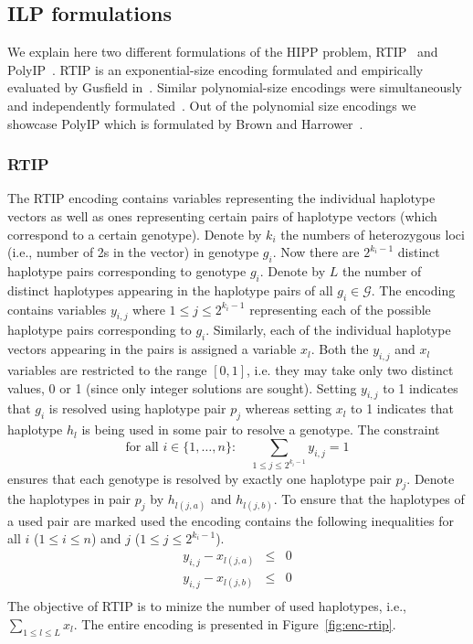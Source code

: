\documentclass[12pt,a4paper]{article}
\begin{document}
\subsection{ILP formulations}
We explain here two different formulations of the HIPP problem, RTIP~\cite{DBLP:conf/cpm/Gusfield03} and PolyIP~\cite{DBLP:journals/tcbb/BrownH06}.
RTIP is an exponential-size encoding formulated and empirically evaluated by Gusfield in~\cite{DBLP:conf/cpm/Gusfield03}.
Similar polynomial-size encodings were simultaneously and independently formulated~\cite{DBLP:journals/tcbb/BrownH06, DBLP:conf/recomb/HalldorssonBELYI02, DBLP:journals/informs/LanciaPR04}.
Out of the polynomial size encodings we showcase PolyIP which is formulated by Brown and Harrower~\cite{DBLP:journals/tcbb/BrownH06}.

\subsubsection{RTIP}

The RTIP encoding contains variables representing the individual haplotype vectors as well as ones representing certain pairs of haplotype vectors (which correspond to a certain genotype).
Denote by $k_i$ the numbers of heterozygous loci (i.e., number of 2s in the vector) in genotype $g_i$.
Now there are $2^{k_i-1}$ distinct haplotype pairs corresponding to genotype $g_i$.
Denote by $L$ the number of distinct haplotypes appearing in the haplotype pairs of all $g_i\in\mathcal{G}$.
The encoding contains variables $y_{i,j}$ where $1\leq j \leq 2^{k_i-1}$ representing each of the possible haplotype pairs corresponding to $g_i$.
Similarly, each of the individual haplotype vectors appearing in the pairs is assigned a variable $x_l$.
Both the $y_{i,j}$ and $x_l$ variables are restricted to the range $[0,1]$, i.e. they may take only two distinct values, 0 or 1 (since only integer solutions are sought).
Setting $y_{i,j}$ to 1 indicates that $g_i$ is resolved using haplotype pair $p_j$ whereas 
setting $x_l$ to 1 indicates that haplotype $h_l$ is being used in some pair to resolve a genotype.
The constraint
$$ \text{for all  }i\in\{1,\dots , n\}:\quad \sum_{1\leq j \leq 2^{k_i-1}} y_{i,j} = 1 $$
ensures that each genotype is resolved by exactly one haplotype pair $p_j$.
Denote the haplotypes in pair $p_j$ by $h_{l(j,a)}$ and $h_{l(j,b)}$.
To ensure that the haplotypes of a used pair are marked used the encoding contains the following inequalities for all $i$ ($1\leq i \leq n$) and $j$ ($1\leq j \leq 2^{k_i-1}$).
\begin{eqnarray*}
y_{i,j} - x_{l(j,a)} & \leq & 0 \\
y_{i,j} - x_{l(j,b)} & \leq & 0 \\
\end{eqnarray*}
The objective of RTIP is to minize the number of used haplotypes, i.e., $\sum_{1\leq l \leq L} x_l$.
The entire encoding is presented in Figure~\ref{fig:enc-rtip}.
\end{document}
